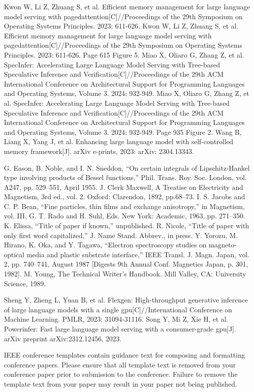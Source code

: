\documentclass[conference]{IEEEtran}
\begin{document}
\begin{thebibliography}{00}
     Kwon W, Li Z, Zhuang S, et al. Efficient memory management for large language model serving with pagedattention[C]//Proceedings of the 29th Symposium on Operating Systems Principles. 2023: 611-626.
     Kwon W, Li Z, Zhuang S, et al. Efficient memory management for large language model serving with pagedattention[C]//Proceedings of the 29th Symposium on Operating Systems Principles. 2023: 611-626. Page 615 Figure 5.
     Miao X, Oliaro G, Zhang Z, et al. SpecInfer: Accelerating Large Language Model Serving with Tree-based Speculative Inference and Verification[C]//Proceedings of the 29th ACM International Conference on Architectural Support for Programming Languages and Operating Systems, Volume 3. 2024: 932-949.
     Miao X, Oliaro G, Zhang Z, et al. SpecInfer: Accelerating Large Language Model Serving with Tree-based Speculative Inference and Verification[C]//Proceedings of the 29th ACM International Conference on Architectural Support for Programming Languages and Operating Systems, Volume 3. 2024: 932-949. Page 935 Figure 2.
     Wang B, Liang X, Yang J, et al. Enhancing large language model with self-controlled memory framework[J]. arXiv e-prints, 2023: arXiv: 2304.13343.

     G. Eason, B. Noble, and I. N. Sneddon, ``On certain integrals of Lipschitz-Hankel type involving products of Bessel functions,'' Phil. Trans. Roy. Soc. London, vol. A247, pp. 529--551, April 1955.
     J. Clerk Maxwell, A Treatise on Electricity and Magnetism, 3rd ed., vol. 2. Oxford: Clarendon, 1892, pp.68--73.
     I. S. Jacobs and C. P. Bean, ``Fine particles, thin films and exchange anisotropy,'' in Magnetism, vol. III, G. T. Rado and H. Suhl, Eds. New York: Academic, 1963, pp. 271--350.
     K. Elissa, ``Title of paper if known,'' unpublished.
     R. Nicole, ``Title of paper with only first word capitalized,'' J. Name Stand. Abbrev., in press.
     Y. Yorozu, M. Hirano, K. Oka, and Y. Tagawa, ``Electron spectroscopy studies on magneto-optical media and plastic substrate interface,'' IEEE Transl. J. Magn. Japan, vol. 2, pp. 740--741, August 1987 [Digests 9th Annual Conf. Magnetics Japan, p. 301, 1982].
     M. Young, The Technical Writer's Handbook. Mill Valley, CA: University Science, 1989.

    Sheng Y, Zheng L, Yuan B, et al. Flexgen: High-throughput generative inference of large language models with a single gpu[C]//International Conference on Machine Learning. PMLR, 2023: 31094-31116.
    Song Y, Mi Z, Xie H, et al. Powerinfer: Fast large language model serving with a consumer-grade gpu[J]. arXiv preprint arXiv:2312.12456, 2023.
\end{thebibliography}
\vspace{12pt}
\color{red}
IEEE conference templates contain guidance text for composing and formatting conference papers. Please ensure that all template text is removed from your conference paper prior to submission to the conference. Failure to remove the template text from your paper may result in your paper not being published.
\end{document}
